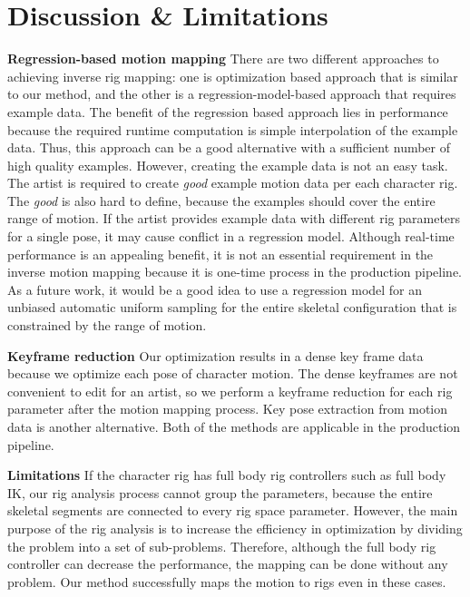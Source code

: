 \section{Discussion \& Limitations}

\textbf{Regression-based motion mapping}
There are two different approaches to achieving inverse rig mapping: one is optimization based approach that is similar to our method, and the other is a regression-model-based approach that requires example data.
The benefit of the regression based approach lies in performance because the required runtime computation is simple interpolation of the example data. Thus, this approach can be a good alternative with a sufficient number of high quality examples. 
However, creating the example data is not an easy task. The artist is required to create \textit{good} example motion data per each character rig. The \textit{good} is also hard to define, because the examples should cover the entire range of motion. If the artist provides example data with different rig parameters for a single pose, it may cause conflict in a regression model.
Although real-time performance is an appealing benefit, it is not an essential requirement in the inverse motion mapping because it is one-time process in the production pipeline.
As a future work, it would be a good idea to use a regression model for an unbiased automatic uniform sampling for the entire skeletal configuration that is constrained by the range of motion.

\textbf{Keyframe reduction}
Our optimization results in a dense key frame data because we optimize each pose of character motion.
The dense keyframes are not convenient to edit for an artist, so we perform a keyframe reduction\cite{seol2011artist} for each rig parameter after the motion mapping process. Key pose extraction from motion data is another alternative\cite{halit2011multiscale}.
Both of the methods are applicable in the production pipeline. 

\textbf{Limitations}
If the character rig has full body rig controllers such as full body IK, our rig analysis process cannot group the parameters, because the entire skeletal segments are connected to every rig space parameter.
However, the main purpose of the rig analysis is to increase the efficiency in optimization by dividing the problem into a set of sub-problems.
Therefore, although the full body rig controller can decrease the performance, the mapping can be done without any problem.
Our method successfully maps the motion to rigs even in these cases.

